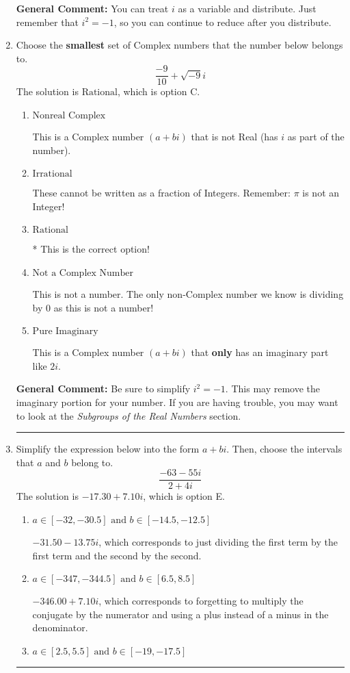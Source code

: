 \documentclass{extbook}[14pt]
\newcommand{\litem}[1]{\item #1

\rule{\textwidth}{0.4pt}}
\begin{document}
\begin{enumerate}
{\textbf{General Comment:} You can treat $i$ as a variable and distribute. Just remember that $i^2=-1$, so you can continue to reduce after you distribute.
}
\litem{
Choose the \textbf{smallest} set of Complex numbers that the number below belongs to.
\[ \frac{-9}{10}+\sqrt{-9}i \]The solution is \( \text{Rational} \), which is option C.\begin{enumerate}[label=\Alph*.]
\item \( \text{Nonreal Complex} \)

This is a Complex number $(a+bi)$ that is not Real (has $i$ as part of the number).
\item \( \text{Irrational} \)

These cannot be written as a fraction of Integers. Remember: $\pi$ is not an Integer!
\item \( \text{Rational} \)

* This is the correct option!
\item \( \text{Not a Complex Number} \)

This is not a number. The only non-Complex number we know is dividing by 0 as this is not a number!
\item \( \text{Pure Imaginary} \)

This is a Complex number $(a+bi)$ that \textbf{only} has an imaginary part like $2i$.
\end{enumerate}

\textbf{General Comment:} Be sure to simplify $i^2 = -1$. This may remove the imaginary portion for your number. If you are having trouble, you may want to look at the \textit{Subgroups of the Real Numbers} section.
}
\litem{
Simplify the expression below into the form $a+bi$. Then, choose the intervals that $a$ and $b$ belong to.
\[ \frac{-63 - 55 i}{2 + 4 i} \]The solution is \( -17.30  + 7.10 i \), which is option E.\begin{enumerate}[label=\Alph*.]
\item \( a \in [-32, -30.5] \text{ and } b \in [-14.5, -12.5] \)

 $-31.50  - 13.75 i$, which corresponds to just dividing the first term by the first term and the second by the second.
\item \( a \in [-347, -344.5] \text{ and } b \in [6.5, 8.5] \)

 $-346.00  + 7.10 i$, which corresponds to forgetting to multiply the conjugate by the numerator and using a plus instead of a minus in the denominator.
\item \( a \in [2.5, 5.5] \text{ and } b \in [-19, -17.5] \)


\end{enumerate}}
\end{enumerate}
\end{document}
